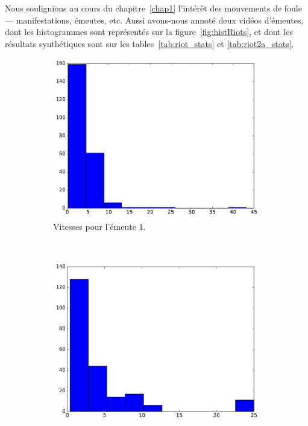 	Nous soulignions au cours du chapitre~\ref{chap1} l'intérêt des mouvements de foule --- manifestations, émeutes, etc. Aussi avons-nous annoté deux vidéos d'émeutes, dont les histogrammes sont représentés sur la figure~\ref{fig:histRiots}, et dont les résultats synthétiques sont sur les tables~\ref{tab:riot_stats} et \ref{tab:riot2a_stats}.

	\begin{figure}[!htbp]
		\begin{subfigure}[t]{\subImgWclicks}
			\centering
			\includegraphics[width=\textwidth]{figures/ch3/riot_filteredSpeed}
			\caption{Vitesses pour l'émeute 1.}
			\label{fig:riot_filteredSpeed}
		\end{subfigure}
		~
		\begin{subfigure}[t]{\subImgWclicks}
			\centering
			\includegraphics[width=\textwidth]{figures/ch3/riot_frequency}

\end{subfigure}
\end{figure}
